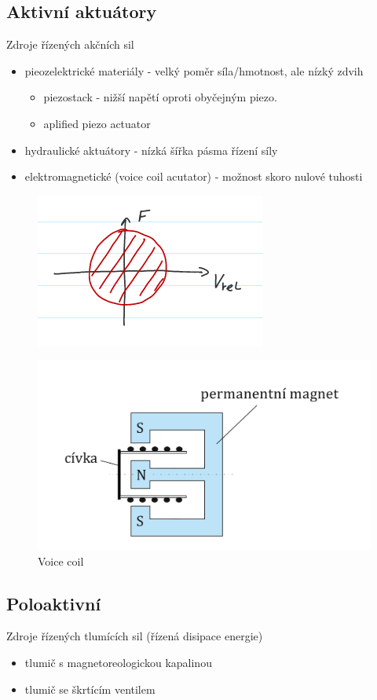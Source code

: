 \documentclass{article}
\begin{document}
	\subsection{Aktivní aktuátory}
	Zdroje řízených akčních sil
	\begin{itemize}
		\item pieozelektrické materiály - velký poměr síla/hmotnost, ale nízký zdvih
			\begin{itemize}
			\item piezostack - nižší napětí oproti obyčejným piezo.
			\item aplified piezo actuator
			\end{itemize}
		\item hydraulické aktuátory - nízká šířka pásma řízení síly
		\item elektromagnetické (voice coil acutator) - možnost skoro nulové tuhosti
	\end{itemize}

	\begin{figure}[h!]
		\centering
		\includegraphics[width=0.4\linewidth]{figs/AktivniAktuator.png}
	\end{figure}

	\begin{figure}[h!]
		\centering
		\includegraphics[width=0.3\linewidth]{figs/VoiceCoil.png}
		\caption{Voice coil}
	\end{figure}

	\subsection{Poloaktivní}
	Zdroje řízených tlumících sil (řízená disipace energie)
	\begin{itemize}
	\item tlumič s magnetoreologickou kapalinou
	\item tlumič se škrtícím ventilem
	\end{itemize}
\end{document}
